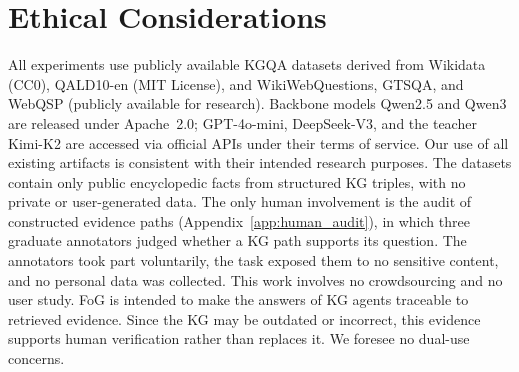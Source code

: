 \section*{Ethical Considerations}

All experiments use publicly available KGQA datasets derived from Wikidata (CC0), QALD10-en (MIT License), and WikiWebQuestions, GTSQA, and WebQSP (publicly available for research). Backbone models Qwen2.5 and Qwen3 are released under Apache~2.0; GPT-4o-mini, DeepSeek-V3, and the teacher Kimi-K2 are accessed via official APIs under their terms of service. Our use of all existing artifacts is consistent with their intended research purposes. The datasets contain only public encyclopedic facts from structured KG triples, with no private or user-generated data. The only human involvement is the audit of constructed evidence paths (Appendix~\ref{app:human_audit}), in which three graduate annotators judged whether a KG path supports its question. The annotators took part voluntarily, the task exposed them to no sensitive content, and no personal data was collected. This work involves no crowdsourcing and no user study. FoG is intended to make the answers of KG agents traceable to retrieved evidence. Since the KG may be outdated or incorrect, this evidence supports human verification rather than replaces it. We foresee no dual-use concerns.